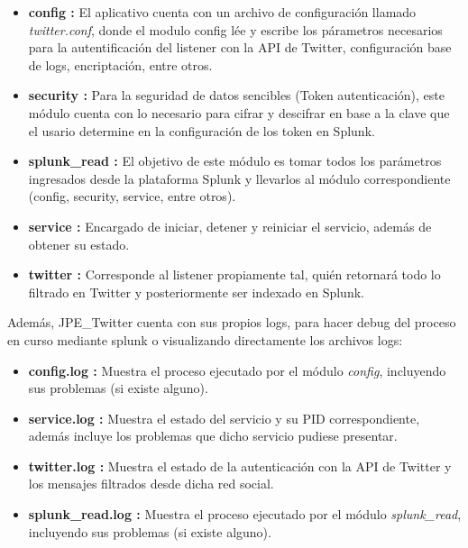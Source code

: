 \documentclass[report]{article}
\begin{document}
\begin{itemize}
\item {\bf config :} El aplicativo cuenta con un archivo de configuraci\'on llamado \textit{twitter.conf}, donde el modulo config l\'ee y escribe los p\'arametros necesarios para la autentificaci\'on del listener con la API de Twitter, configuraci\'on base de logs, encriptaci\'on, entre otros.

\item {\bf security :} Para la seguridad de datos sencibles (Token autenticaci\'on), este m\'odulo cuenta con lo necesario para cifrar y descifrar en base a la clave que el usario determine en la configuraci\'on de los token en Splunk.

\item {\bf splunk\_read :} El objetivo de este m\'odulo es tomar todos los par\'ametros ingresados desde la plataforma Splunk y llevarlos al m\'odulo correspondiente (config, security, service, entre otros).

\item {\bf service :} Encargado de iniciar, detener y reiniciar el servicio, adem\'as de obtener su estado.

\item {\bf twitter :} Corresponde al listener propiamente tal, qui\'en retornar\'a todo lo filtrado en Twitter y posteriormente ser indexado en Splunk.
\newline
\end{itemize}

Adem\'as, JPE\_Twitter cuenta con sus propios logs, para hacer debug del proceso en curso mediante splunk o visualizando directamente los archivos logs:
\newline
\begin{itemize}
\item {\bf config.log :} Muestra el proceso ejecutado por el m\'odulo \textit{config}, incluyendo sus problemas (si existe alguno).
\item {\bf service.log :} Muestra el estado del servicio y su PID correspondiente, adem\'as incluye los problemas que dicho servicio pudiese presentar.
\item {\bf twitter.log :} Muestra el estado de la autenticaci\'on con la API de Twitter y los mensajes filtrados desde dicha red social.
\item {\bf splunk\_read.log :} Muestra el proceso ejecutado por el m\'odulo \textit{splunk\_read}, incluyendo sus problemas (si existe alguno).
\newline
\end{itemize}
\end{document}
